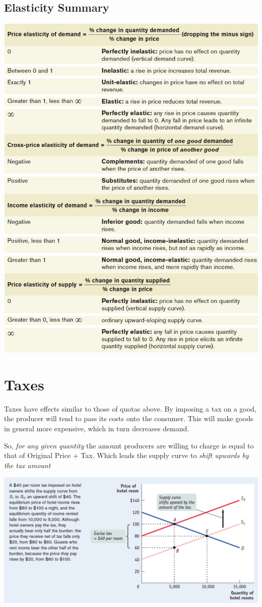 \documentclass[english,course]{Notes}
\newcommand{\ita}[1]{\textit{#1}}
\begin{document}
\subsection{Elasticity Summary}
\includegraphics[height=1.1\textwidth]{elasticSum}
 
 \newpage
 
 \section{Taxes} 


\par{Taxes have effects similar to those of quotas above. By imposing a tax on a good, the producer will tend to pass its costs onto the consumer. This will make goods in general more expensive, which in turn decreases demand.}
\par{So, \ita{for any given quantity} the amount producers are willing to charge is equal to that of Original Price + Tax. Which leads the supply curve to \ita{shift upwards by the tax amount}}

\includegraphics[width=\textwidth]{tax1}
\end{document}
